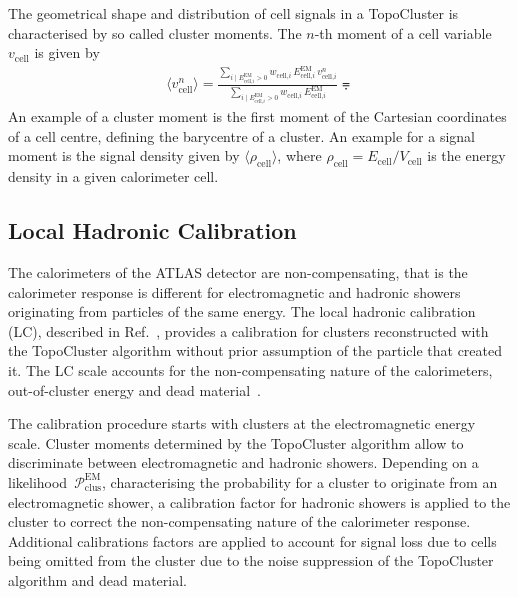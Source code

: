The geometrical shape and distribution of cell signals in a TopoCluster is
characterised by so called cluster moments. The $n$-th moment of a cell
variable~$v_\text{cell}$ is given by \cite{atlas_topoclustering}
\begin{align*}
  \langle v_\text{cell}^n \rangle = \frac{\sum_{i \mid E_{\text{cell,}i}^\text{EM} > 0} w_{\text{cell,}i} \, E_{\text{cell,}i}^\text{EM} \, v_{\text{cell,}i}^n}{\sum_{i \mid E_{\text{cell,}i}^\text{EM} > 0} w_{\text{cell,}i} \, E_{\text{cell,}i}^\text{EM}} \eqdot
\end{align*}
An example of a cluster moment is the first moment of the Cartesian coordinates
of a cell centre, defining the barycentre of a cluster. An example for a signal
moment is the signal density given by $\langle \rho_\text{cell} \rangle$, where
$\rho_\text{cell} = E_\text{cell} / V_\text{cell}$ is the energy density in a
given calorimeter cell.

\subsection{Local Hadronic Calibration}
\label{sec:local_hadronic_calib}

The calorimeters of the ATLAS detector are non-compensating, that is the
calorimeter response is different for electromagnetic and hadronic showers
originating from particles of the same energy. The local hadronic calibration
(LC), described in Ref.~\cite{atlas_topoclustering}, provides a calibration for
clusters reconstructed with the TopoCluster algorithm without prior assumption
of the particle that created it. The LC scale accounts for the non-compensating
nature of the calorimeters, out-of-cluster energy and dead
material~\cite{atlas_topoclustering}.

The calibration procedure starts with clusters at the electromagnetic energy
scale. Cluster moments determined by the TopoCluster algorithm allow to
discriminate between electromagnetic and hadronic showers. Depending on a
likelihood~$\mathcal{P}_\text{clus}^\text{EM}$, characterising the probability
for a cluster to originate from an electromagnetic shower, a calibration factor
for hadronic showers is applied to the cluster to correct the non-compensating
nature of the calorimeter response. Additional calibrations factors are applied
to account for signal loss due to cells being omitted from the cluster due to
the noise suppression of the TopoCluster algorithm and dead material.

